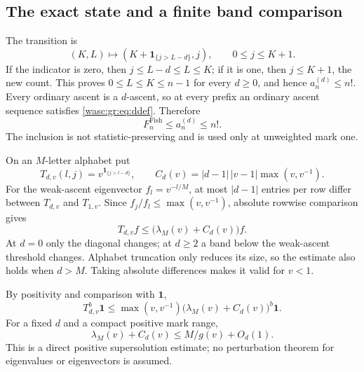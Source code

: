 \documentclass[11pt,a4paper]{article}
\theoremstyle{remark}\newtheorem{remark}[theorem]{Remark}
\newcommand{\ind}{\mathbf 1}\newcommand{\wasc}{\operatorname{wasc}}\newcommand{\dasc}{\operatorname{dasc}}
\numberwithin{equation}{section}
\begin{document}
\subsection{The exact state and a finite band comparison}
The transition is
\begin{equation}\label{wasc:gr:eq:dtransition}
(K,L)\longmapsto(K+\ind_{\{j>L-d\}},j),\qquad0\le j\le K+1.
\end{equation}
If the indicator is zero, then $j\le L-d\le L\le K$; if it is one, then $j\le K+1$, the new count. This proves $0\le L\le K\le n-1$ for every $d\ge0$, and hence $a_n^{(d)}\le n!$. Every ordinary ascent is a $d$-ascent, so at every prefix an ordinary ascent sequence satisfies \eqref{wasc:gr:eq:ddef}. Therefore
\begin{equation}\label{wasc:gr:eq:dinclusion}
F_n^{\mathrm{Fish}}\le a_n^{(d)}\le n!.
\end{equation}
The inclusion is not statistic-preserving and is used only at unweighted mark one.

On an $M$-letter alphabet put
\[
T_{d,v}(l,j)=v^{\ind_{\{j>l-d\}}},\qquad
C_d(v)=|d-1|\,|v-1|\max(v,v^{-1}).
\]
For the weak-ascent eigenvector $f_l=v^{-l/M}$, at most $|d-1|$ entries per row differ between $T_{d,v}$ and $T_{1,v}$. Since $f_j/f_l\le\max(v,v^{-1})$, absolute rowwise comparison gives
\begin{equation}\label{wasc:gr:eq:dsupersolution}
T_{d,v}f\le\bigl(\lambda_M(v)+C_d(v)\bigr)f.
\end{equation}
At $d=0$ only the diagonal changes; at $d\ge2$ a band below the weak-ascent threshold changes. Alphabet truncation only reduces its size, so the estimate also holds when $d>M$. Taking absolute differences makes it valid for $v<1$.

By positivity and comparison with $\mathbf1$,
\begin{equation}\label{wasc:gr:eq:dblockmatrix}
T_{d,v}^b\mathbf1\le\max(v,v^{-1})
\bigl(\lambda_M(v)+C_d(v)\bigr)^b\mathbf1.
\end{equation}
For a fixed $d$ and a compact positive mark range,
\[
\lambda_M(v)+C_d(v)\le M/g(v)+O_d(1).
\]
This is a direct positive supersolution estimate; no perturbation theorem for eigenvalues or eigenvectors is assumed.
\end{document}
